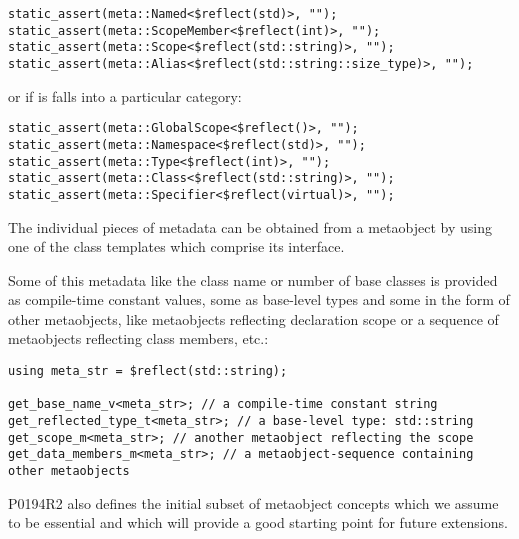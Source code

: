 \begin{verbatim}
static_assert(meta::Named<$reflect(std)>, "");
static_assert(meta::ScopeMember<$reflect(int)>, "");
static_assert(meta::Scope<$reflect(std::string)>, "");
static_assert(meta::Alias<$reflect(std::string::size_type)>, "");
\end{verbatim}

or if is falls into a particular category:

\begin{verbatim}
static_assert(meta::GlobalScope<$reflect()>, "");
static_assert(meta::Namespace<$reflect(std)>, "");
static_assert(meta::Type<$reflect(int)>, "");
static_assert(meta::Class<$reflect(std::string)>, "");
static_assert(meta::Specifier<$reflect(virtual)>, "");
\end{verbatim}

The individual pieces of metadata can be obtained from a metaobject by using one
of the class templates which comprise its interface.

Some of this metadata like the class name or number of base classes is provided
as compile-time constant values, some as base-level types
and some in the form of other metaobjects, like metaobjects
reflecting declaration scope or a sequence of metaobjects reflecting class members,
etc.:

\begin{verbatim}
using meta_str = $reflect(std::string);

get_base_name_v<meta_str>; // a compile-time constant string
get_reflected_type_t<meta_str>; // a base-level type: std::string
get_scope_m<meta_str>; // another metaobject reflecting the scope
get_data_members_m<meta_str>; // a metaobject-sequence containing other metaobjects
\end{verbatim}

P0194R2 also defines the initial subset
of metaobject concepts which we assume to be essential
and which will provide a good starting point for future extensions.

